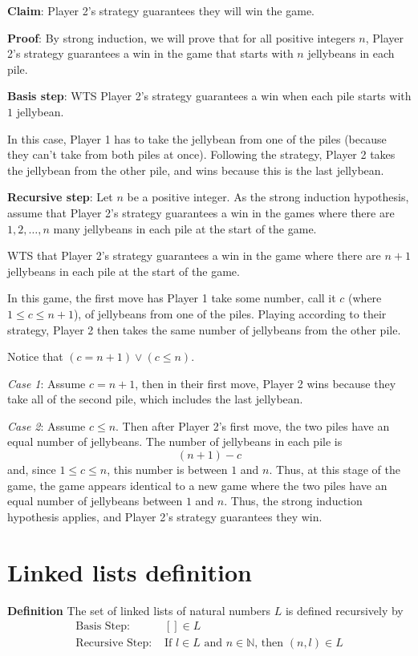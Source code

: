 \documentclass[12pt, oneside]{article}
\begin{document}
{\bf Claim}: Player 2's strategy guarantees they will win the game.

{\bf Proof}: By strong induction, we will prove that for all positive 
integers $n$, Player 2's strategy guarantees a win in the game that starts with 
$n$ jellybeans in each pile.

{\bf Basis step}: WTS Player 2's strategy guarantees a win 
when each pile starts with $1$ jellybean.

In this case, Player 1 has to take the jellybean from one of the piles
(because they can't take from both piles at once).
Following the strategy, Player 2 takes the jellybean from the 
other pile, and wins because this is the last jellybean.

{\bf Recursive step}: Let $n$ be a positive integer. 
As the strong induction hypothesis, assume that
Player 2's strategy guarantees a win in the games 
where there are $1, 2, \ldots, n$ many jellybeans in each 
pile at the start of the game.

WTS that Player 2's strategy guarantees a win in the game where
there are $n+1$ jellybeans in each pile at the start of the game.

In this game, the first move has Player 1 take 
some number, call it $c$ (where $1 \leq c \leq n+1$),
of jellybeans from one of the piles. 
Playing according to their strategy, Player 2 then 
takes the same number of jellybeans from  the other pile.

Notice that $(c = n+1) \lor (c \leq n)$.

{\it Case 1}: Assume $c = n+1$, then in their first move, 
Player 2 wins because they take all of the second pile, which 
includes the last jellybean.

{\it Case 2}: Assume $c \leq n$. Then after Player 2's first move,
the two piles have an equal number of jellybeans. The number
of jellybeans in each pile is 
\[
    (n+1) - c
\]
and, since $1 \leq c \leq n$, this number is between $1$ and $n$.
Thus, at this stage of the game, the game appears identical to a new 
game where the two piles have an equal number of jellybeans between $1$
and $n$. Thus, the strong induction hypothesis applies, and Player 2's
strategy guarantees they win.

 \vfill
\section*{Linked lists definition}


{\bf Definition} The set of linked lists of natural numbers $L$ is defined recursively by
\[
\begin{array}{ll}
    \textrm{Basis Step: } & [] \in L \\
    \textrm{Recursive Step: } & \textrm{If } l \in L\textrm{ and }n \in \mathbb{N} \textrm{, then } (n, l) \in L
\end{array}
\] \vfill
\end{document}
